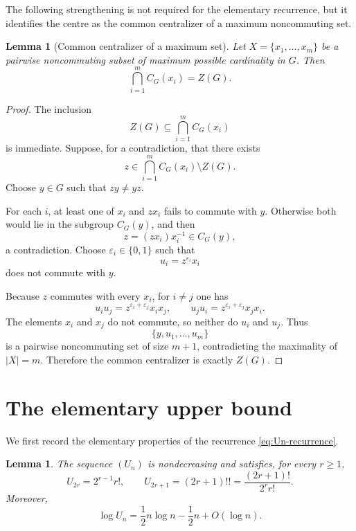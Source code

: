 \documentclass[11pt]{article}
\newtheorem{lemma}[theorem]{Lemma}
\theoremstyle{definition}
\begin{document}
The following strengthening is not required for the elementary recurrence, but it identifies the centre as the common centralizer of a maximum noncommuting set.

\begin{lemma}[Common centralizer of a maximum set]\label{lem:common-centralizer}
Let $X=\{x_1,\dots,x_m\}$ be a pairwise noncommuting subset of maximum possible cardinality in $G$.  Then
\[
 \bigcap_{i=1}^m C_G(x_i)=Z(G).
\]
\end{lemma}

\begin{proof}
The inclusion
\[
 Z(G)\subseteq\bigcap_{i=1}^m C_G(x_i)
\]
is immediate.  Suppose, for a contradiction, that there exists
\[
 z\in\bigcap_{i=1}^m C_G(x_i)\setminus Z(G).
\]
Choose $y\in G$ such that $zy\ne yz$.

For each $i$, at least one of $x_i$ and $zx_i$ fails to commute with $y$.  Otherwise both would lie in the subgroup $C_G(y)$, and then
\[
 z=(zx_i)x_i^{-1}\in C_G(y),
\]
a contradiction.  Choose $\varepsilon_i\in\{0,1\}$ such that
\[
 u_i=z^{\varepsilon_i}x_i
\]
does not commute with $y$.

Because $z$ commutes with every $x_i$, for $i\ne j$ one has
\[
 u_i u_j=z^{\varepsilon_i+\varepsilon_j}x_ix_j,
 \qquad
 u_j u_i=z^{\varepsilon_i+\varepsilon_j}x_jx_i.
\]
The elements $x_i$ and $x_j$ do not commute, so neither do $u_i$ and $u_j$.  Thus
\[
 \{y,u_1,\dots,u_m\}
\]
is a pairwise noncommuting set of size $m+1$, contradicting the maximality of $|X|=m$.  Therefore the common centralizer is exactly $Z(G)$.
\end{proof}

\section{The elementary upper bound}

We first record the elementary properties of the recurrence \eqref{eq:Un-recurrence}.

\begin{lemma}\label{lem:Un-properties}
The sequence $(U_n)$ is nondecreasing and satisfies, for every $r\ge1$,
\[
 U_{2r}=2^{r-1}r!,
 \qquad
 U_{2r+1}=(2r+1)!!=\frac{(2r+1)!}{2^r r!}.
\]
Moreover,
\[
 \log U_n=\frac12n\log n-\frac12n+O(\log n).
\]
\end{lemma}
\end{document}
